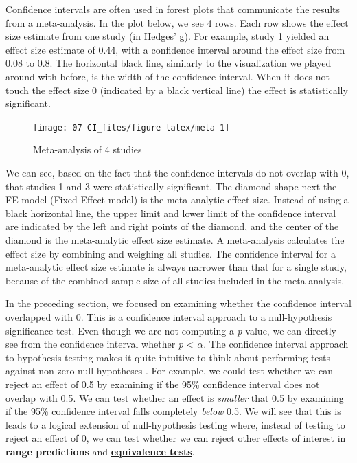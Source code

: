 \documentclass[
  oneside]{book}
\begin{document}
Confidence intervals are often used in forest plots that communicate the results from a meta-analysis. In the plot below, we see 4 rows. Each row shows the effect size estimate from one study (in Hedges' g). For example, study 1 yielded an effect size estimate of 0.44, with a confidence interval around the effect size from 0.08 to 0.8. The horizontal black line, similarly to the visualization we played around with before, is the width of the confidence interval. When it does not touch the effect size 0 (indicated by a black vertical line) the effect is statistically significant.

\begin{figure}

{\centering \texttt{[image: 07-CI\_files/figure-latex/meta-1]} 

}

\caption{Meta-analysis of 4 studies}\label{fig:meta}
\end{figure}

We can see, based on the fact that the confidence intervals do not overlap with 0, that studies 1 and 3 were statistically significant. The diamond shape next the FE model (Fixed Effect model) is the meta-analytic effect size. Instead of using a black horizontal line, the upper limit and lower limit of the confidence interval are indicated by the left and right points of the diamond, and the center of the diamond is the meta-analytic effect size estimate. A meta-analysis calculates the effect size by combining and weighing all studies. The confidence interval for a meta-analytic effect size estimate is always narrower than that for a single study, because of the combined sample size of all studies included in the meta-analysis.

In the preceding section, we focused on examining whether the confidence interval overlapped with 0. This is a confidence interval approach to a null-hypothesis significance test. Even though we are not computing a \emph{p}-value, we can directly see from the confidence interval whether \emph{p} \textless{} \(\alpha\). The confidence interval approach to hypothesis testing makes it quite intuitive to think about performing tests against non-zero null hypotheses \citep{bauer_unifying_1996}. For example, we could test whether we can reject an effect of 0.5 by examining if the 95\% confidence interval does not overlap with 0.5. We can test whether an effect is \emph{smaller} that 0.5 by examining if the 95\% confidence interval falls completely \emph{below} 0.5. We will see that this is leads to a logical extension of null-hypothesis testing where, instead of testing to reject an effect of 0, we can test whether we can reject other effects of interest in \textbf{range predictions} and \protect\hyperlink{equivalencetest}{\textbf{equivalence tests}}.
\end{document}
